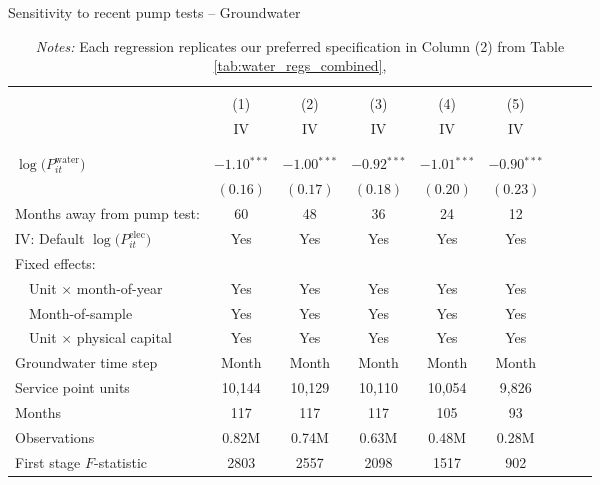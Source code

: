 \begin{table}[t!]\centering
\small
\caption{Sensitivity to recent pump tests -- Groundwater  \label{tab:water_months_from_pump_test}}
\vspace{-0.1cm}
\small
\begin{adjustbox}{center} 
\begin{tabular}{lcccccccc} 
\hline \hline
\vspace{-0.37cm}
\\
 & (1)  & (2)  & (3)  & (4)  & (5)  \\ 
[0.1em]
 & IV & IV & IV & IV & IV \\
\vspace{-0.37cm}
\\
\cline{2-6}
\vspace{-0.27cm}
\\
 $\log\big(P^{\text{water}}_{it}\big)$ ~ & 
 $-1.10$$^{***}$  & $-1.00$$^{***}$ & $-0.92$$^{***}$ & $-1.01$$^{***}$ & $-0.90$$^{***}$ \\ 
& $(0.16)$ & $(0.17)$ & $(0.18)$ & $(0.20)$ & $(0.23)$  \\
[1.5em] 
Months away from pump test: & 60 & 48 & 36 & 24 & 12 \\
[1em] 
IV: Default $\log\big(P^{\text{elec}}_{it}\big)$  & Yes & Yes & Yes  & Yes  & Yes  \\
[1em] 
Fixed effects: \\
[0.1em] 
~~Unit $\times$ month-of-year  & Yes  & Yes  & Yes   & Yes  & Yes   \\ 
[0.1em] 
~~Month-of-sample  & Yes  & Yes  & Yes  & Yes  & Yes    \\ 
[0.1em] 
~~Unit $\times$ physical capital & Yes & Yes & Yes & Yes & Yes  \\
[1em] 
Groundwater time step & Month & Month & Month & Month & Month  \\ 
[1.5em] 
Service point units & 10,144 & 10,129 & 10,110 & 10,054 & 9,826  \\ 
[0.1em] 
Months  & 117 & 117 & 117 & 105 & 93 \\ 
[0.1em] 
Observations & 0.82M & 0.74M & 0.63M & 0.48M & 0.28M  \\ 
[0.1em] 
First stage $F$-statistic & 2803 & 2557 & 2098 & 1517 & 902  \\ 
[0.15em]
\hline
\end{tabular}
\end{adjustbox}
\captionsetup{width=\textwidth}
\caption*{\scriptsize \emph{Notes:} 
Each regression replicates our preferred specification in Column (2) from Table \ref{tab:water_regs_combined}, 
}
\end{table}
